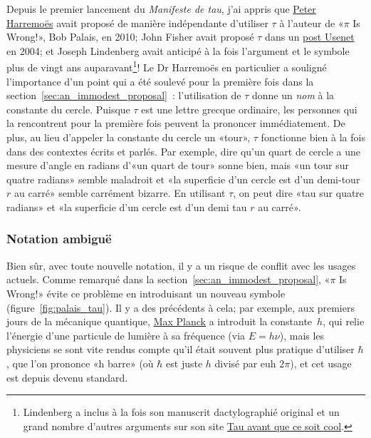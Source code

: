 Depuis le premier lancement du \emph{Manifeste de tau}, j'ai appris que
\href{http://www.harremoes.dk/Peter/Undervis/Turnpage/Turnpage1.pdf}{Peter
Harremoës} avait proposé de manière indépendante d'utiliser $\tau$ à l'auteur de
«\ns $\pi$ Is Wrong!\ns », Bob Palais, en 2010\ns; John Fisher avait proposé $\tau$ dans
un
\href{https://groups.google.com/forum/#!msg/sci.math/c-DHmJHSA0A/sLCoOtHB1UAJ}{post
Usenet} en 2004\ns; et Joseph Lindenberg avait anticipé à la fois l'argument et le
symbole plus de vingt ans auparavant\ns\footnote{Lindenberg a inclus à la fois
son manuscrit dactylographié original et un grand nombre d'autres arguments sur
son site
\href{https://translate.google.com/translate?hl=en&sl=en&tl=fr&u=https://sites.google.com/site/taubeforeitwascool/}{Tau
avant que ce soit cool}.}\ns! Le Dr Harremoës en
particulier a souligné l'importance d'un point qui a été soulevé pour la
première fois dans la section~\ref{sec:an_immodest_proposal}~: l'utilisation de
$\tau$ donne un \emph{nom} à la constante du cercle. Puisque $\tau$ est une
lettre grecque ordinaire, les personnes qui la rencontrent pour la première fois
peuvent la prononcer immédiatement. De plus, au lieu d'appeler la
constante du cercle un «\ns tour\ns », $\tau$ fonctionne bien à la fois dans des
contextes écrits et parlés. Par exemple, dire qu'un quart de cercle a une
mesure d'angle en radians d'«\ns un quart de tour\ns » sonne bien, mais «\ns un tour sur quatre
radians\ns » semble maladroit et «\ns la superficie d'un cercle est d'un demi-tour $r$
au carré\ns » semble carrément bizarre. En utilisant $\tau$, on peut dire «\ns tau
sur quatre radians\ns » et «\ns la superficie d'un cercle est d'un demi tau $r$ au
carré\ns ».

    \subsubsection{Notation ambiguë} %
    \label{sec:ambiguous_notation}


Bien sûr, avec toute nouvelle notation, il y a un risque de conflit avec
les usages actuels. Comme remarqué dans la
section~\ref{sec:an_immodest_proposal}, «\ns $\pi$ Is Wrong!\ns » évite ce problème
en introduisant un nouveau symbole (figure~\ref{fig:palais_tau}). Il y a des
précédents à cela\ns; par exemple, aux premiers jours de la mécanique quantique,
\href{https://fr.wikipedia.org/wiki/Max_Planck}{Max Planck} a introduit la
constante~$h$, qui relie l'énergie d'une particule de lumière à sa fréquence (via
$E = h\nu$), mais les physiciens se sont vite rendus compte qu'il était souvent
plus pratique d'utiliser $\hbar$, que l'on prononce «\ns h barre\ns » (où $\hbar$
est juste $h$ divisé par\textellipsis{} euh\textellipsis{} $2\pi$), et cet usage
est depuis devenu standard.

